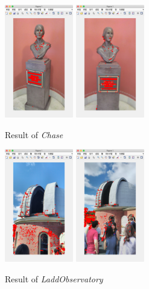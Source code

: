 \begin{figure}[!hp]
  \centering
  \includegraphics[width=3cm]{ch1.png}
  \includegraphics[width=3cm]{ch2.png}
  \caption{Result of \textit{Chase}}
  \label{fig:Chase}
\end{figure}

\begin{figure}[!hp]
  \centering
  \includegraphics[width=3cm]{ob1.png}
  \includegraphics[width=3cm]{ob2.png}
  \caption{Result of \textit{LaddObservatory}}
  \label{fig:LaddObservatory}
\end{figure}

